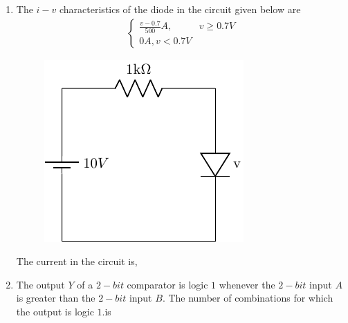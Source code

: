\documentclass[journal]{IEEEtran}
\begin{document}
\begin{enumerate}
\begin{enumerate}
\end{enumerate}
\item The $i-v$ characteristics of the diode in the circuit given below are
	\begin{align*}
	\begin{cases}
		\frac{v-0.7}{500}A, &v\ge0.7V\\
		0A, v<0.7V
	\end{cases}
	\end{align*}
\begin{figure}[H]
			\centering
			\includegraphics[scale=0.75]{figs/q18.png}
			\label{stemplot}
		\end{figure}
		The current in the circuit is,
	\begin{enumerate}
\end{enumerate}
\item The output $Y$ of a $2-bit$ comparator is logic $1$ whenever the $2-bit$ input $A$ is greater than the $2-bit$ input $B$. The number of combinations for which the output is logic $1$.is
\begin{enumerate}
\end{enumerate}
\end{enumerate}
\end{document}
